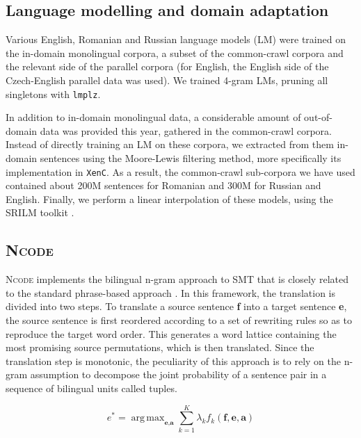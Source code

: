 \documentclass[11pt]{article}
\DeclareMathOperator*{\argmax}{arg\,max}
\newcommand{\ncode}{\textsc{Ncode}\xspace}
\newcommand{\lmplz}{\texttt{lmplz}\xspace}
\newcommand{\xenc}{\texttt{XenC}\xspace}
\begin{document}
\subsection{Language modelling and domain adaptation}
\label{ssec:lm}

Various English, Romanian and Russian language models (LM)
were trained on the in-domain monolingual corpora,
a subset of the common-crawl corpora and the relevant side of the parallel corpora (for
English, the English side of the Czech-English parallel
data was used). We trained 4-gram LMs, pruning all
singletons with \lmplz \cite{Heafield11kenlm}.

In addition to in-domain monolingual data, a considerable amount
of out-of-domain data was provided this year, gathered in the common-crawl
corpora. Instead of directly training an LM on these corpora, we extracted from them
in-domain sentences using the Moore-Lewis \cite{Moore2010} filtering method,
more specifically its implementation in \xenc \cite{Rousseau13}. As a result,
the common-crawl sub-corpora we have used contained about 200M sentences for Romanian
and 300M for Russian and English.
Finally, we perform a linear interpolation of these models,
using the SRILM toolkit \cite{stolcke02:sae}.

\subsection{\ncode}
\label{ssec:ncode}

\ncode implements the bilingual n-gram approach to SMT
\cite{casacuberta04,crego06reorder,Marino06}
that is closely related to the standard phrase-based approach
\cite{zens02:pbs}.  In this framework, the translation is divided
into two steps. To translate a source sentence \textbf{f} into
a target sentence \textbf{e}, the source sentence is first
reordered according to a set of rewriting rules so as to reproduce the
target word order. This generates a word lattice containing
the most promising source permutations, which is then translated.
Since the translation step is monotonic, the peculiarity of this approach
is to rely on the n-gram assumption to decompose the joint probability
of a sentence pair in a sequence of bilingual units called tuples.

\[
e^{*} = \argmax_{\textbf{e},\textbf{a}} \sum_{k=1}^K \lambda_k f_k(\textbf{f}, \textbf{e}, \textbf{a})
\]
\end{document}
